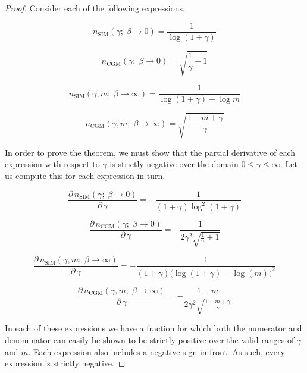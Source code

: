 \begin{proof}
    Consider each of the following expressions.

    \begin{equation*}
        n_{\text{SIM}}(\gamma ; \; \beta \rightarrow 0) =  \frac{1}{\log(1 + \gamma)}
     \end{equation*}

     \begin{equation*}
        n_{\text{CGM}}(\gamma ; \; \beta \rightarrow 0) = \sqrt{\frac{1}{\gamma} + 1}
     \end{equation*}

    \begin{equation*}
        n_{\text{SIM}}(\gamma, m; \; \beta \rightarrow \infty) =  \frac{1}{\log(1 + \gamma) - \log m}
    \end{equation*}

    \begin{equation*}
        n_{\text{CGM}}(\gamma, m; \; \beta \rightarrow \infty) = \sqrt{\frac{1 - m + \gamma}{\gamma}}
    \end{equation*}

In order to prove the theorem, we must show that the partial derivative of each expression with respect to $\gamma$ is strictly negative over the domain $0 \leq \gamma \leq \infty$. Let us compute this for each expression in turn. 

\begin{equation*}
    \frac{\partial \,  n_{\text{SIM}}(\gamma ; \; \beta \rightarrow 0)}{\partial \, \gamma} = - \frac{1}{(1 + \gamma)\log^2(1 + \gamma)}
\end{equation*}

\begin{equation*}
    \frac{\partial \,  n_{\text{CGM}}(\gamma ; \; \beta \rightarrow 0)}{\partial \, \gamma}  = - \frac{1}{2 \gamma^2 \sqrt{\frac{1}{\gamma} + 1}}
\end{equation*}

\begin{equation*}
    \frac{\partial \,  n_{\text{SIM}}(\gamma, m ; \; \beta \rightarrow \infty)}{\partial \, \gamma}  =  - \frac{1}{(1 + \gamma)\big(\log(1 + \gamma) - \log(m) \big)^2}
\end{equation*}

\begin{equation*}
    \frac{\partial \,  n_{\text{CGM}}(\gamma, m ; \; \beta \rightarrow \infty)}{\partial \, \gamma}  = - \frac{1 - m}{2 \gamma^2 \sqrt{\frac{1 - m + \gamma}{\gamma}}}
\end{equation*}

In each of these expressions we have a fraction for which both the numerator and denominator can easily be shown to be strictly positive over the valid ranges of $\gamma$ and $m$. Each expression also includes a negative sign in front. As such, every expression is strictly negative. 

\end{proof}

